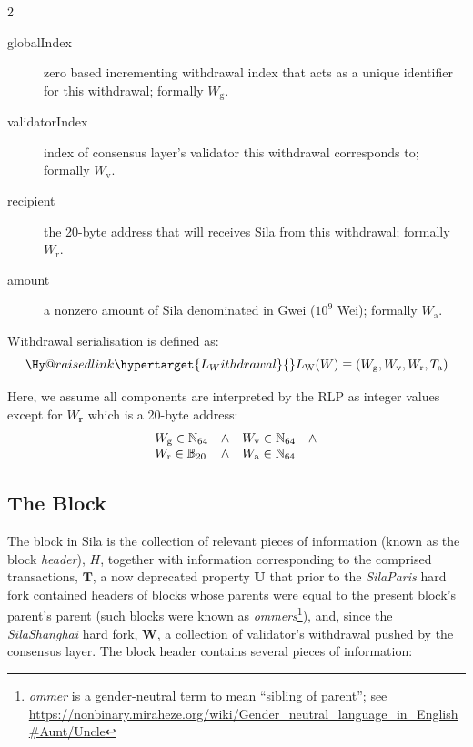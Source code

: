 \documentclass[9pt,oneside]{amsart}
\makeatletter
\newcommand{\linkdest}[1]{\Hy@raisedlink{\hypertarget{#1}{}}}
\makeatother
\begin{document}
\begin{multicols}{2}
\begin{description}
\item[globalIndex] zero based incrementing withdrawal index that acts as a unique identifier for this withdrawal; formally $W_{\mathrm{g}}$.
\item[validatorIndex] index of consensus layer's validator this withdrawal corresponds to; formally $W_{\mathrm{v}}$.
\item[recipient] the 20-byte address that will receives Sila from this withdrawal; formally $W_{\mathrm{r}}$.
\item[amount] a nonzero amount of Sila denominated in Gwei ($10^9$ Wei); formally $W_{\mathrm{a}}$.
\end{description}

Withdrawal serialisation is defined as:
\begin{equation}
\linkdest{L_Withdrawal} L_{\mathrm{W}}(W) \equiv 
(W_{\mathrm{g}}, W_{\mathrm{v}}, W_{\mathrm{r}}, T_{\mathrm{a}})
\end{equation}

Here, we assume all components are interpreted by the RLP as integer values except for $W_\mathbf{r}$ which is a 20-byte address:
\begin{equation}
\begin{array}[t]{lclc}
W_{\mathrm{g}} \in \mathbb{N}_{64} & \wedge & W_{\mathrm{v}} \in \mathbb{N}_{64} & \wedge \\
W_{\mathrm{r}} \in \mathbb{B}_{20} & \wedge & W_{\mathrm{a}} \in \mathbb{N}_{64}
\end{array}
\end{equation}

\subsection{The Block}\linkdest{block}\label{subsec:The_Block}

The block in Sila is the collection of relevant pieces of information (known as the block \textit{header}), $H$, together with information corresponding to the comprised transactions,
$\mathbf{T}$,\hypertarget{ommerheaders}{} a now deprecated property $\mathbf{U}$ that prior to the \textit{SilaParis} hard fork contained headers of blocks whose parents were equal to the present block's parent's parent (such blocks were known as \textit{ommers}\footnote{\textit{ommer} is a gender-neutral term to mean ``sibling of parent''; see \url{https://nonbinary.miraheze.org/wiki/Gender_neutral_language_in_English\#Aunt/Uncle}}),
and, since the \textit{SilaShanghai} hard fork, $\mathbf{W}$, a collection of validator's withdrawal pushed by the consensus layer. The block header contains several pieces of information:


\end{multicols}
\end{document}
